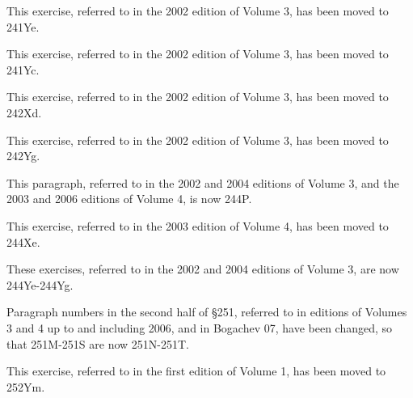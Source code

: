  This exercise, referred to in
the 2002 edition of Volume 3, has been moved to 241Ye.

 This exercise, referred to in
the 2002 edition of Volume 3, has been moved to 241Yc.

 This exercise,
referred to in the 2002 edition of Volume 3, has been moved to
242Xd.

 This exercise, referred to in
the 2002 edition of Volume 3, has been moved to 242Yg.

 This paragraph, referred to in the 
2002 and 2004 editions of Volume 3, and the 2003 and 2006 editions of
Volume 4, is now 244P.

 This exercise, referred to in the
2003 edition of Volume 4, has been moved to 244Xe.

 These exercises, referred
to in the 2002 and 2004 editions of Volume 3, are now 
244Ye-244Yg.  %

 Paragraph numbers in the second half of \S2{}51, referred
to in editions of Volumes 3 and 4 up to and including 2006, and in {\smc
Bogachev 07}, have been
changed, so that 2{}51M-2{}51S are now 251N-251T.

%

 This exercise, referred to in the first
edition of Volume 1, has been moved to 252Ym.






